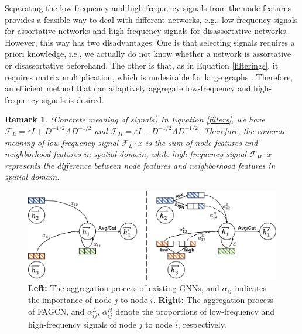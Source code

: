 \documentclass[letterpaper]{article} %
\newtheorem{remark}{Remark}
\begin{document}
Separating the low-frequency and high-frequency signals from the node features provides a feasible way to deal with different networks, e.g., low-frequency signals for assortative networks and high-frequency signals for disassortative networks.
However, this way has two disadvantages: One is that selecting signals requires a priori knowledge, i.e., we actually do not know whether a network is assortative or disassortative beforehand. The other is that, as in Equation \ref{filterings}, it requires matrix multiplication, which is undesirable for large graphs \cite{GraphSAGE}.
Therefore, an efficient method that can adaptively aggregate low-frequency and high-frequency signals is desired.


\begin{remark}
\label{rema}
	(Concrete meaning of signals)
	In Equation \ref{filters}, we have $\mathcal{F}_{L} = \varepsilon I + D^{-1/2}AD^{-1/2}$ and $\mathcal{F}_{H} = \varepsilon I - D^{-1/2}AD^{-1/2}$.
	Therefore, the concrete meaning of low-frequency signal $\mathcal{F}_{L} \cdot x$ is the sum of node features and neighborhood features in spatial domain, while high-frequency signal $\mathcal{F}_{H} \cdot x$ represents the difference between node features and neighborhood features in spatial domain.
\end{remark}

\begin{figure}
\centering
\includegraphics[width=\linewidth]{image/model}
\caption{\textbf{Left:} The aggregation process of existing GNNs, and $\alpha_{ij}$ indicates the importance of node $j$ to node $i$. \textbf{Right:} The aggregation process of FAGCN, and $\alpha_{ij}^{L}$, $\alpha_{ij}^{H}$ denote the proportions of low-frequency and high-frequency signals of node $j$ to node $i$, respectively.}
\label{model}
\end{figure}
\end{document}
